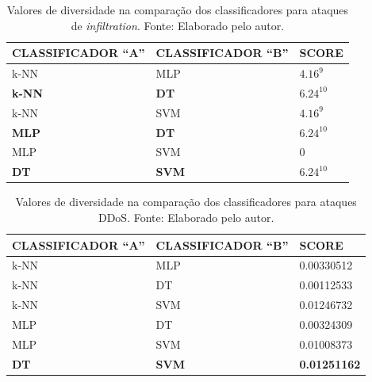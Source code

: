 \begin{description}
\begin{longtable}{l|l|l}
\end{longtable}









\begin{longtable}{l|l|l}
\caption{Valores de diversidade na comparação dos classificadores para ataques de \textit{infiltration}. Fonte: Elaborado pelo autor.}

\label{tab:diversidade_infiltration}

\hline


\textbf{CLASSIFICADOR ``A''} & \textbf{CLASSIFICADOR ``B''} 		& \textbf{SCORE}         \\ \hline \hline

k-NN & MLP & $4.16^9$ \\ \hline
\textbf{k-NN} & \textbf{DT}  & \textbf{$6.24^{10}$} \\ \hline
k-NN & SVM & $4.16^9$ \\ \hline
\textbf{MLP}  & \textbf{DT}  & \textbf{$6.24^{10}$} \\ \hline
MLP  & SVM & 0 \\ \hline
\textbf{DT}   & \textbf{SVM} & \textbf{$6.24^{10}$} \\ \hline


\end{longtable}











\newpage


\begin{longtable}{l|l|l}
\caption{Valores de diversidade na comparação dos classificadores para ataques DDoS. Fonte: Elaborado pelo autor.}

\label{tab:diversidade_ddos}

\hline


\textbf{CLASSIFICADOR ``A''} & \textbf{CLASSIFICADOR ``B''} 		& \textbf{SCORE}         \\ \hline \hline




k-NN & MLP & 0.00330512 \\ \hline
k-NN & DT  & 0.00112533 \\ \hline
k-NN & SVM & 0.01246732 \\ \hline
MLP  & DT  & 0.00324309 \\ \hline
MLP  & SVM & 0.01008373 \\ \hline
\textbf{DT}   & \textbf{SVM} & \textbf{0.01251162} \\ \hline



\end{longtable}
\end{description}
